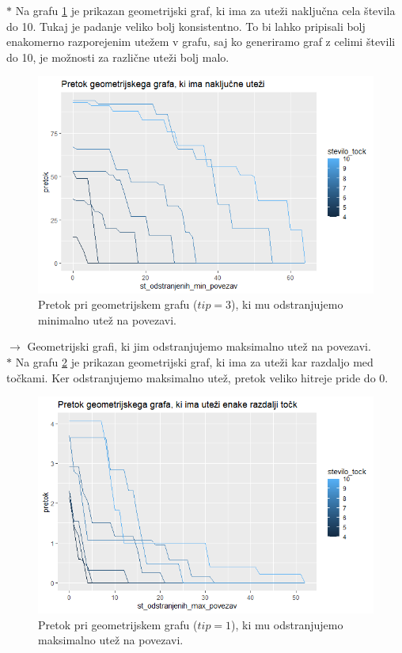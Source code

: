 \documentclass[a4paper]{article}
\begin{document}
$\ast$ Na grafu \ref{fig11} je prikazan geometrijski graf, ki ima za uteži naključna cela števila do 10. Tukaj je padanje veliko bolj konsistentno. To bi lahko pripisali bolj enakomerno razporejenim utežem v grafu, saj ko generiramo graf z celimi števili do 10, je možnosti za različne uteži bolj malo. 
\begin{figure}[H]
\centerline{\includegraphics[scale=.5]{p9.PNG}}
\caption{Pretok pri geometrijskem grafu ($tip = 3$), ki mu odstranjujemo minimalno utež na povezavi.}
\label{fig11}
\end{figure} 

\newpage
$\rightarrow $ Geometrijski grafi, ki jim odstranjujemo maksimalno utež na povezavi. \\

$\ast$ Na grafu \ref{fig12} je prikazan geometrijski graf, ki ima za uteži kar razdaljo med točkami. Ker odstranjujemo maksimalno utež, pretok veliko hitreje pride do 0. 
\begin{figure}[H]
\centerline{\includegraphics[scale=.5]{p8_1.PNG}}
\caption{Pretok pri geometrijskem grafu ($tip = 1$), ki mu odstranjujemo maksimalno utež na povezavi.}
\label{fig12}
\end{figure}
\end{document}
